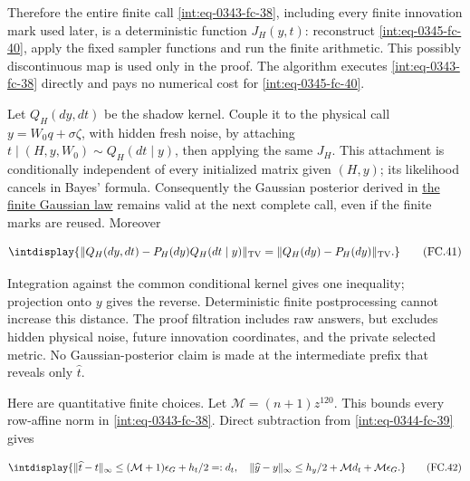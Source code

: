 
Therefore the entire finite call \eqref{int:eq-0343-fc-38}, including every finite innovation mark used later, is a deterministic function \(J_H(y,\allowbreak t)\): reconstruct \eqref{int:eq-0345-fc-40}, apply the fixed sampler functions and run the finite arithmetic. This possibly discontinuous map is used only in the proof. The algorithm executes \eqref{int:eq-0343-fc-38} directly and pays no numerical cost for \eqref{int:eq-0345-fc-40}.



Let \(Q_H(dy,\allowbreak dt)\) be the shadow kernel. Couple it to the physical call \(y=W_0q+\sigma\zeta\), with hidden fresh noise, by attaching \(t\mid(H,\allowbreak y,\allowbreak W_0)\sim Q_H(dt\mid y)\), then applying the same \(J_H\). This attachment is conditionally independent of every initialized matrix given \((H,\allowbreak y)\); its likelihood cancels in Bayes' formula. Consequently the Gaussian posterior derived in \hyperref[int:decoder-gaussian-law]{the finite Gaussian law} remains valid at the next complete call, even if the finite marks are reused. Moreover


\begingroup\renewcommand{\theHequation}{intdisplay.743}
\begin{equation}
\intdisplay{
\|Q_H(dy,dt)-P_H(dy)Q_H(dt\mid y)\|_{\rm TV}
=\|Q_H(dy)-P_H(dy)\|_{\rm TV}.
}
\tag{FC.41}
\label{int:eq-0346-fc-41}
\end{equation}
\endgroup


Integration against the common conditional kernel gives one inequality; projection onto \(y\) gives the reverse. Deterministic finite postprocessing cannot increase this distance. The proof filtration includes raw answers, but excludes hidden physical noise, future innovation coordinates, and the private selected metric. No Gaussian-posterior claim is made at the intermediate prefix that reveals only \(\widehat t\).



Here are quantitative finite choices. Let \(\mathcal M=(n+1)z^{120}\). This bounds every row-affine norm in \eqref{int:eq-0343-fc-38}. Direct subtraction from \eqref{int:eq-0344-fc-39} gives


\begingroup\renewcommand{\theHequation}{intdisplay.744}
\begin{equation}
\intdisplay{
\|\widehat t-t\|_\infty
\le(\mathcal M+1)\epsilon_G+h_t/2=:d_t,
\quad
\|\widehat y-y\|_\infty
\le h_y/2+\mathcal M d_t+\mathcal M\epsilon_G.
}
\tag{FC.42}
\label{int:eq-0347-fc-42}
\end{equation}
\endgroup

